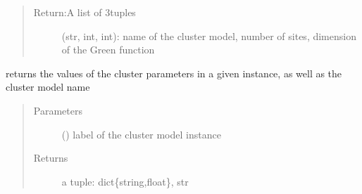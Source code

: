 \documentclass[letterpaper,10pt,english]{sphinxmanual}
\begin{document}
\begin{fulllineitems}
\label{\detokenize{functions:pyqcm.cluster_info}}\begin{quote}\begin{description}
\item[{Return:A list of 3\sphinxhyphen{}tuples}] \leavevmode
\sphinxAtStartPar
(str, int, int): name of the cluster model, number of sites, dimension of the Green function

\end{description}\end{quote}

\end{fulllineitems}


\begin{fulllineitems}
\label{\detokenize{functions:pyqcm.cluster_parameters}}
\sphinxAtStartPar
returns the values of the cluster parameters in a given instance, as well as the cluster model name
\begin{quote}\begin{description}
\item[{Parameters}] \leavevmode
\sphinxAtStartPar
{} () \textendash{} label of the cluster model instance

\item[{Returns}] \leavevmode
\sphinxAtStartPar
a tuple:  dict\{string,float\}, str

\end{description}\end{quote}

\end{fulllineitems}

\end{document}

